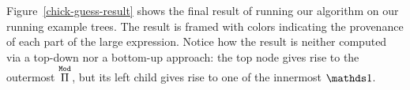 

Figure~\ref{chick-guess-result} shows the final result of running our algorithm
on our running example trees.  The result is framed with colors indicating the
provenance of each part of the large expression.  Notice how the result is
neither computed via a top-down nor a bottom-up approach: the top node gives
rise to the outermost $\overset{\mathtt{Mod}}{\Pi}{}$, but its left child gives rise to one of
the innermost $\MathSame{}$.


